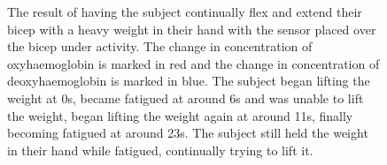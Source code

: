 \begin{figure}[htp]
\centering
{}
\caption[Bicep Measurements with Continuous Fexion and Extension with a Weight]{The result of having the subject continually flex and extend their bicep with a heavy weight in their hand with the sensor placed over the bicep under activity. The change in concentration of oxyhaemoglobin is marked in red and the change in concentration of deoxyhaemoglobin is marked in blue. The subject began lifting the weight at 0s, became fatigued at around 6s and was unable to lift the weight, began lifting the weight again at around 11s, finally becoming fatigued at around 23s. The subject still held the weight in their hand while fatigued, continually trying to lift it.}
\end{figure}

